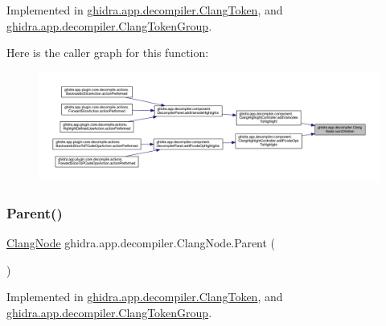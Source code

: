 Implemented in \mbox{\hyperlink{classghidra_1_1app_1_1decompiler_1_1_clang_token_a32dba894529a2a7bb3aa7ba488b63af2}{ghidra.\+app.\+decompiler.\+Clang\+Token}}, and \mbox{\hyperlink{classghidra_1_1app_1_1decompiler_1_1_clang_token_group_a68d733e3de7a23187bc6e17891b01a63}{ghidra.\+app.\+decompiler.\+Clang\+Token\+Group}}.

Here is the caller graph for this function\+:
\nopagebreak
\begin{figure}[H]
\begin{center}
\leavevmode
\includegraphics[width=350pt]{interfaceghidra_1_1app_1_1decompiler_1_1_clang_node_a28f5c1cfc3842ee74333e5d5a5910976_icgraph}
\end{center}
\end{figure}
\mbox{\label{interfaceghidra_1_1app_1_1decompiler_1_1_clang_node_a27b0287e5069850a61b4312f7d2737a4}} 
\subsubsection{\texorpdfstring{Parent()}{Parent()}}
{\footnotesize\ttfamily \mbox{\hyperlink{interfaceghidra_1_1app_1_1decompiler_1_1_clang_node}{Clang\+Node}} ghidra.\+app.\+decompiler.\+Clang\+Node.\+Parent (\begin{DoxyParamCaption}{ }\end{DoxyParamCaption})}



Implemented in \mbox{\hyperlink{classghidra_1_1app_1_1decompiler_1_1_clang_token_ae1b89249984d1228998b6fe8ed8c67b9}{ghidra.\+app.\+decompiler.\+Clang\+Token}}, and \mbox{\hyperlink{classghidra_1_1app_1_1decompiler_1_1_clang_token_group_a3f9dca7140c0110a3fa83c4b81f7886e}{ghidra.\+app.\+decompiler.\+Clang\+Token\+Group}}.

